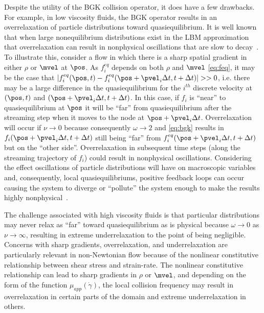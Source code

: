Despite the utility of the BGK collision operator, it does have a few drawbacks.
For example, in low viscosity fluids, the BGK operator results in an overrelaxation of particle distributions toward quasiequilibrium.
It is well known that when large nonequilibrium distributions exist in the LBM approximation that overrelaxation can result in nonphysical oscillations that are slow to decay~\cite{brownlee2007stability,dellar2003incompressible}.
To illustrate this, consider a flow in which there is a sharp spatial gradient in either $\rho$ or $\mvel$ at $\pos$.
As $f_i^{eq}$ depends on both $\rho$ and $\mvel$ \eqref{eq:feq}, it may be the case that $|f_i^{eq}(\pos, t) - f_i^{eq}(\pos + \pvel_i \Delta t, t + \Delta t)| >> 0$, i.e. there may be a large difference in the quasiequilibrium for the $i^{th}$ discrete velocity at $(\pos, t)$ and $(\pos + \pvel_i \Delta t, t + \Delta t)$.
In this case, if $f_i$ is ``near'' to quasiequilibrium at $\pos$ it will be ``far'' from quasiequilibrium after the streaming step when it moves to the node at $\pos + \pvel_i \Delta t$.
Overrelaxation will occur if $\nu \rightarrow 0$ because consequently $\omega \rightarrow 2$ and \eqref{eq:bgk} results in $f_i(\pos + \pvel_i \Delta t,t + \Delta t)$ still being ``far'' from $f^{eq}_i(\pos + \pvel_i \Delta t,t + \Delta t)$ but on the ``other side''.
Overrelaxation in subsequent time steps (along the streaming trajectory of $f_i$) could result in nonphysical oscillations.
Considering the effect oscillations of particle distributions will have on macroscopic variables and, consequently, local quasiequilibriums, positive feedback loops can occur causing the system to diverge or ``pollute'' the system enough to make the results highly nonphysical~\cite{gorban2014enhancement}.

The challenge associated with high viscosity fluids is that particular distributions may never relax as ``far'' toward quasiequilibrium as is physical because $\omega \rightarrow 0$ as $\nu \rightarrow \infty$, resulting in extreme underrelaxation to the point of being negligible.
Concerns with sharp gradients, overrelaxation, and underrelaxation are particularly relevant in non-Newtonian flow because of the nonlinear constitutive relationship between shear stress and strain-rate.
The nonlinear constitutive relationship can lead to sharp gradients in $\rho$ or $\mvel$, and depending on the form of the function $\mu_{app}(\dot{\gamma})$, the local collision frequency may result in overrelaxation in certain parts of the domain and extreme underrelaxation in others.


